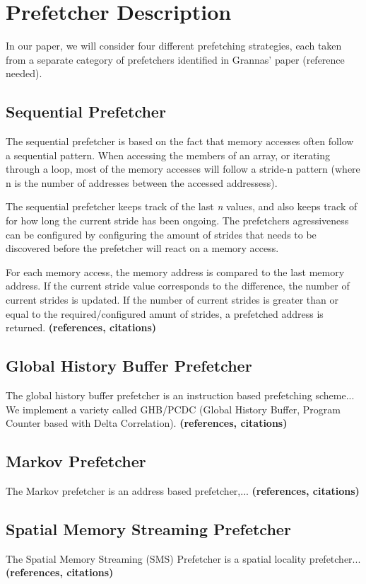
\section{Prefetcher Description}
\label{sec:prefetcherDescription}

In our paper, we will consider four different prefetching strategies,
each taken from a separate category of prefetchers identified in
Grannas' paper (reference needed).

\subsection{Sequential Prefetcher}
\label{sec:sequentialPrefetcher}
The sequential prefetcher is based on the fact that memory accesses often follow a sequential pattern. When accessing the members of an array, or iterating through a loop, most of the memory accesses will follow a stride-n pattern (where n is the number of addresses between the accessed addressess). 

The sequential prefetcher keeps track of the last \emph{n} values, and also keeps track of for how long the current stride has been ongoing. The prefetchers agressiveness can be configured by configuring the amount of strides that needs to be discovered before the prefetcher will react on a memory access. 

For each memory access, the memory address is compared to the last memory address. If the current stride value corresponds to the difference, the number of current strides is updated. If the number of current strides is greater than or equal to the required/configured amunt of strides, a prefetched address is returned.
{\bf (references, citations)}

\subsection{Global History Buffer Prefetcher}
\label{sec:ghbPcdcPrefetcher}
The global history buffer prefetcher is an instruction based
prefetching scheme... We implement a variety called GHB/PCDC (Global
History Buffer, Program Counter based with Delta Correlation).
{\bf (references, citations)}

\subsection{Markov Prefetcher}
\label{sec:markovPrefetcher}
The Markov prefetcher is an address based prefetcher,...
{\bf (references, citations)}

\subsection{Spatial Memory Streaming Prefetcher}
\label{sec:smsPrefetcher}
The Spatial Memory Streaming (SMS) Prefetcher is a spatial locality
prefetcher...  {\bf (references, citations)}
